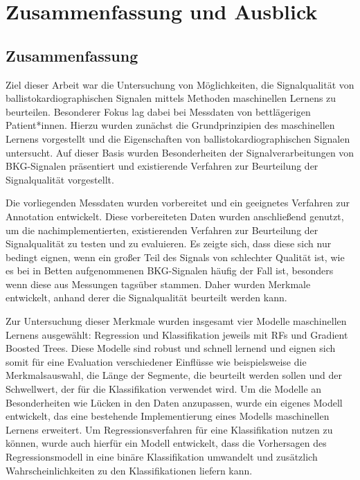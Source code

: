 \chapter{Zusammenfassung und Ausblick}\label{zusammenfassung}

\section{Zusammenfassung}

Ziel dieser Arbeit war die Untersuchung von Möglichkeiten, die Signalqualität von ballistokardiographischen Signalen mittels Methoden maschinellen Lernens zu beurteilen. Besonderer Fokus lag dabei bei Messdaten von bettlägerigen Patient*innen. Hierzu wurden zunächst die Grundprinzipien des maschinellen Lernens vorgestellt und die Eigenschaften von ballistokardiographischen Signalen untersucht. Auf dieser Basis wurden Besonderheiten der Signalverarbeitungen von \ac{BKG}-Signalen präsentiert und existierende Verfahren zur Beurteilung der Signalqualität vorgestellt.

Die vorliegenden Messdaten wurden vorbereitet und ein geeignetes Verfahren zur Annotation entwickelt. Diese vorbereiteten Daten wurden anschließend genutzt, um die nachimplementierten, existierenden Verfahren zur Beurteilung der Signalqualität zu testen und zu evaluieren. Es zeigte sich, dass diese sich nur bedingt eignen, wenn ein großer Teil des Signals von schlechter Qualität ist, wie es bei in Betten aufgenommenen \ac{BKG}-Signalen häufig der Fall ist, besonders wenn diese aus Messungen tagsüber stammen. Daher wurden Merkmale entwickelt, anhand derer die Signalqualität beurteilt werden kann.

Zur Untersuchung dieser Merkmale wurden insgesamt vier Modelle maschinellen Lernens ausgewählt: Regression und Klassifikation jeweils mit \acl{RF}s und Gradient Boosted Trees. Diese Modelle sind robust und schnell lernend und eignen sich somit für eine Evaluation verschiedener Einflüsse wie beispielsweise die Merkmalsauswahl, die Länge der Segmente, die beurteilt werden sollen und der Schwellwert, der für die Klassifikation verwendet wird. Um die Modelle an Besonderheiten wie Lücken in den Daten anzupassen, wurde ein eigenes Modell entwickelt, das eine bestehende Implementierung eines Modells maschinellen Lernens erweitert. Um Regressionsverfahren für eine Klassifikation nutzen zu können, wurde auch hierfür ein Modell entwickelt, dass die Vorhersagen des Regressionsmodell in eine binäre Klassifikation umwandelt und zusätzlich Wahrscheinlichkeiten zu den Klassifikationen liefern kann.

